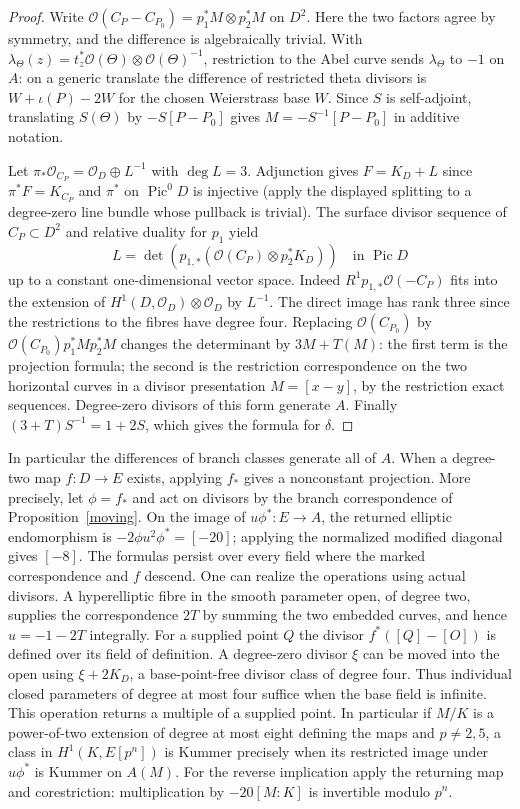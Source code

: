 \documentclass[11pt]{article}
\newcommand{\Pic}{\operatorname{Pic}}
\begin{document}
\begin{proof}
Write $\mathcal O(C_P-C_{P_0})=p_1^*M\otimes p_2^*M$ on $D^2$.
Here the two factors agree by symmetry, and the difference is
algebraically trivial. With $\lambda_\Theta(z)=t_z^*\mathcal O(\Theta)
\otimes\mathcal O(\Theta)^{-1}$, restriction to the Abel curve sends
$\lambda_\Theta$ to $-1$ on $A$: on a generic translate the difference
of restricted theta divisors is $W+\iota(P)-2W$ for the chosen
Weierstrass base $W$. Since $S$ is self-adjoint, translating $S(\Theta)$
by $-S[P-P_0]$ gives $M=-S^{-1}[P-P_0]$ in additive notation.

Let $\pi_*\mathcal O_{C_P}=\mathcal O_D\oplus L^{-1}$ with $\deg L=3$.
Adjunction gives $F=K_D+L$ since $\pi^*F=K_{C_P}$ and $\pi^*$ on
$\Pic^0 D$ is injective (apply the displayed splitting to a degree-zero
line bundle whose pullback is trivial). The surface divisor sequence
of $C_P\subset D^2$ and relative duality for $p_1$ yield
\[
 L=\det(p_{1,*}(\mathcal O(C_P)\otimes p_2^*K_D))
 \quad\text{in }\Pic D
\]
up to a constant one-dimensional vector space. Indeed
$R^1 p_{1,*}\mathcal O(-C_P)$ fits into the extension of
$H^1(D,\mathcal O_D)\otimes\mathcal O_D$ by $L^{-1}$.
The direct image has rank three since the restrictions to the
fibres have degree four. Replacing $\mathcal O(C_{P_0})$ by
$\mathcal O(C_{P_0})p_1^*M p_2^*M$ changes the determinant by
$3M+T(M)$: the first term is the projection formula; the second
is the restriction correspondence on the two horizontal curves
in a divisor presentation $M=[x-y]$, by the restriction exact
sequences. Degree-zero divisors of this form generate $A$.
Finally $(3+T)S^{-1}=1+2S$, which gives the formula for $\delta$.
\end{proof}

In particular the differences of branch classes generate all of $A$.
When a degree-two map $f:D\to E$ exists, applying $f_*$ gives a
nonconstant projection. More precisely, let $\phi=f_*$ and act on
divisors by the branch correspondence of Proposition~\ref{moving}.
On the image of $u\phi^*:E\to A$, the returned elliptic endomorphism
is $-2\phi u^2\phi^*=[-20]$; applying the normalized modified
diagonal gives $[-8]$. The formulas persist over every field where
the marked correspondence and $f$ descend. One can realize the
operations using actual divisors. A hyperelliptic fibre in the smooth
parameter open, of degree two, supplies the correspondence $2T$
by summing the two embedded curves, and hence $u=-1-2T$ integrally.
For a supplied point $Q$ the divisor $f^*([Q]-[O])$ is defined over
its field of definition. A degree-zero divisor $\xi$ can be moved
into the open using $\xi+2K_D$, a base-point-free divisor class
of degree four. Thus individual closed parameters of degree at
most four suffice when the base field is infinite. This operation
returns a multiple of a supplied point. In particular if $M/K$ is a
power-of-two extension of degree at most eight defining the maps
and $p\ne2,5$, a class in $H^1(K,E[p^n])$ is Kummer precisely when
its restricted image under $u\phi^*$ is Kummer on $A(M)$.
For the reverse implication apply the returning map and corestriction:
multiplication by $-20[M:K]$ is invertible modulo $p^n$.
\end{document}
